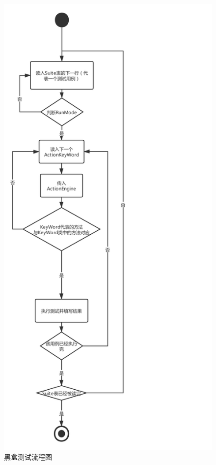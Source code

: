 \documentclass[hyperref, a4paper]{ctexart}
\begin{document}
\begin{figure}
  \centering
  \includegraphics[width=18cm]{./assets/FlowChart.pdf}
  \caption{黑盒测试流程图}\label{1}
\end{figure}
\end{document}
